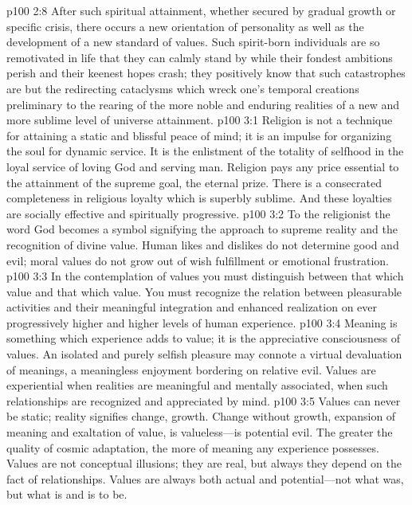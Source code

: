 \vs p100 2:8 After such spiritual attainment, whether secured by gradual growth or specific crisis, there occurs a new orientation of personality as well as the development of a new standard of values. Such spirit\hyp{}born individuals are so remotivated in life that they can calmly stand by while their fondest ambitions perish and their keenest hopes crash; they positively know that such catastrophes are but the redirecting cataclysms which wreck one’s temporal creations preliminary to the rearing of the more noble and enduring realities of a new and more sublime level of universe attainment.\plusone
{}
\vs p100 3:1 Religion is not a technique for attaining a static and blissful peace of mind; it is an impulse for organizing the soul for dynamic service. It is the enlistment of the totality of selfhood in the loyal service of loving God and serving man. Religion pays any price essential to the attainment of the supreme goal, the eternal prize. There is a consecrated completeness in religious loyalty which is superbly sublime. And these loyalties are socially effective and spiritually progressive.
\vs p100 3:2 To the religionist the word God becomes a symbol signifying the approach to supreme reality and the recognition of divine value. Human likes and dislikes do not determine good and evil; moral values do not grow out of wish fulfillment or emotional frustration.
\vs p100 3:3 In the contemplation of values you must distinguish between that which  value and that which  value. You must recognize the relation between pleasurable activities and their meaningful integration and enhanced realization on ever progressively higher and higher levels of human experience.
\pc \vs p100 3:4 Meaning is something which experience adds to value; it is the appreciative consciousness of values. An isolated and purely selfish pleasure may connote a virtual devaluation of meanings, a meaningless enjoyment bordering on relative evil. Values are experiential when realities are meaningful and mentally associated, when such relationships are recognized and appreciated by mind.
\pc \vs p100 3:5 Values can never be static; reality signifies change, growth. Change without growth, expansion of meaning and exaltation of value, is valueless---is potential evil. The greater the quality of cosmic adaptation, the more of meaning any experience possesses. Values are not conceptual illusions; they are real, but always they depend on the fact of relationships. Values are always both actual and potential---not what was, but what is and is to be.
